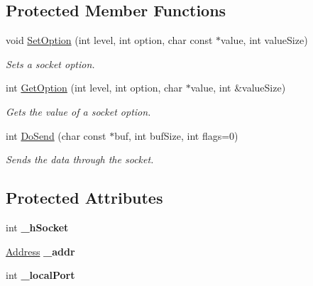 \subsection*{Protected Member Functions}
\begin{DoxyCompactItemize}
\item 
void \hyperlink{class_common_1_1_socket_base_a69b836d84796dd832a6d11cfddb063ad}{Set\-Option} (int level, int option, char const $\ast$value, int value\-Size)
\begin{DoxyCompactList}\small\item\em Sets a socket option. \end{DoxyCompactList}\item 
int \hyperlink{class_common_1_1_socket_base_a27f7a61c9ceed20ef25f1d065ba43f9b}{Get\-Option} (int level, int option, char $\ast$value, int \&value\-Size)
\begin{DoxyCompactList}\small\item\em Gets the value of a socket option. \end{DoxyCompactList}\item 
int \hyperlink{class_common_1_1_socket_base_a3dea32372a026c14eb2449423d712f55}{Do\-Send} (char const $\ast$buf, int buf\-Size, int flags=0)
\begin{DoxyCompactList}\small\item\em Sends the data through the socket. \end{DoxyCompactList}\end{DoxyCompactItemize}
\subsection*{Protected Attributes}
\begin{DoxyCompactItemize}
\item 
\hypertarget{class_common_1_1_socket_base_a3923ae765d527acad5334bee8793a496}{int {\bfseries \-\_\-h\-Socket}}\label{class_common_1_1_socket_base_a3923ae765d527acad5334bee8793a496}

\item 
\hypertarget{class_common_1_1_socket_base_ac1beb15ed02aa737be32a7218f46525a}{\hyperlink{class_common_1_1_address}{Address} {\bfseries \-\_\-addr}}\label{class_common_1_1_socket_base_ac1beb15ed02aa737be32a7218f46525a}

\item 
\hypertarget{class_common_1_1_socket_base_ae99426b4c4b9979c1d2b5d67b6782068}{int {\bfseries \-\_\-local\-Port}}\label{class_common_1_1_socket_base_ae99426b4c4b9979c1d2b5d67b6782068}

\end{DoxyCompactItemize}


